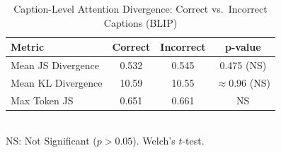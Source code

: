
\begin{table}[!t]
\renewcommand{\arraystretch}{1.2}
\caption{Caption-Level Attention Divergence: Correct vs.\ Incorrect Captions (BLIP)}
\label{tab:caption_level}
\centering
\begin{tabular}{lccc}
\hline
\textbf{Metric} & \textbf{Correct} & \textbf{Incorrect} & \textbf{p-value} \\
\hline
Mean JS Divergence   & 0.532 & 0.545 & 0.475 (NS) \\
Mean KL Divergence   & 10.59 & 10.55 & $\approx$0.96 (NS) \\
Max Token JS         & 0.651 & 0.661 & NS \\
\hline
\end{tabular}
\\
\small NS: Not Significant ($p > 0.05$). Welch's $t$-test.
\end{table}
